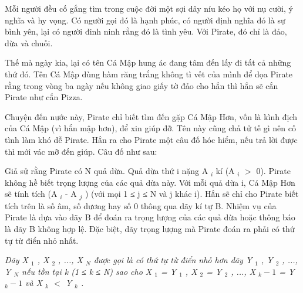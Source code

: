 Mỗi người đều cố gắng tìm trong cuộc đời một sợi dây níu kéo họ với nụ cười, ý nghĩa và hy vọng. Có người gọi đó là hạnh phúc, có người định nghĩa đó là sự bình yên, lại có người đinh ninh rằng đó là tình yêu. Với Pirate, đó chỉ là đảo, dừa và chuối.  

   Thế mà ngày kia, lại có tên Cá Mập hung ác đang tâm đến lấy đi tất cả những thứ đó. Tên Cá Mập dùng hàm răng trắng không tì vết của mình để dọa Pirate rằng trong vòng ba ngày nếu không giao giấy tờ đảo cho hắn thì hắn sẽ cắn Pirate như cắn Pizza.  

   Chuyện đến nước này, Pirate chỉ biết tìm đến gặp Cá Mập Hơn, vốn là kình địch của Cá Mập (vì hắn mập hơn), để xin giúp đỡ. Tên này cũng chả tử tế gì nên cố tình làm khó dễ Pirate. Hắn ra cho Pirate một câu đố hóc hiểm, nếu trả lời được thì mới vác mỡ đến giúp. Câu đố như sau:  

   Giả sử rằng Pirate có N quả dừa. Quả dừa thứ i nặng A   $_    i   $   kí (A   $_    i   $   $>$ 0). Pirate không hề biết trọng lượng của các quả dừa này. Với mỗi quả dừa i, Cá Mập Hơn sẽ tính tích (A   $_    i   $   - A   $_    j   $   ) (với mọi 1 ≤ j ≤ N và j khác i). Hắn sẽ chỉ cho Pirate biết tích trên là số âm, số dương hay số 0 thông qua dãy kí tự B. Nhiệm vụ của Pirate là dựa vào dãy B để đoán ra trọng lượng của các quả dừa hoặc thông báo là dãy B không hợp lệ. Đặc biệt, dãy trọng lượng mà Pirate đoán ra phải có thứ tự từ điển nhỏ nhất.  

\emph{    Dãy X    $_     1    $    , X    $_     2    $    , ..., X    $_     N    $    được gọi là có thứ tự từ điển nhỏ hơn dãy Y    $_     1    $    , Y    $_     2    $    , ..., Y    $_     N    $    nếu tồn tại k (1 ≤ k ≤ N) sao cho X    $_     1    $    = Y    $_     1    $    , X    $_     2    $    = Y    $_     2    $    , ..., X    $_     k - 1    $    = Y    $_     k - 1    $    và X    $_     k    $    $<$ Y    $_     k    $    .   }